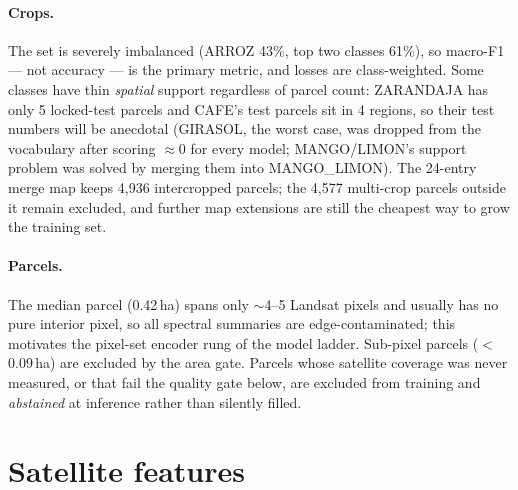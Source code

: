 \documentclass[11pt,a4paper]{article}
\begin{document}
\paragraph{Crops.} The set is severely imbalanced (ARROZ 43\%, top two classes 61\%), so
macro-F1 --- not accuracy --- is the primary metric, and losses are class-weighted. Some
classes have thin \emph{spatial} support regardless of parcel count: ZARANDAJA has only 5
locked-test parcels and CAFE's test parcels sit in 4 regions, so their test numbers will be
anecdotal (GIRASOL, the worst case, was dropped from the vocabulary after scoring
$\approx$0 for every model; MANGO/LIMON's support problem was solved by merging them into
MANGO\_LIMON). The 24-entry merge map keeps 4{,}936 intercropped parcels; the 4{,}577
multi-crop parcels outside it remain excluded, and further map extensions are still the
cheapest way to grow the training set.

\paragraph{Parcels.} The median parcel (0.42\,ha) spans only $\sim$4--5 Landsat pixels and
usually has no pure interior pixel, so all spectral summaries are edge-contaminated; this
motivates the pixel-set encoder rung of the model ladder. Sub-pixel parcels ($<$0.09\,ha) are
excluded by the area gate. Parcels whose satellite coverage was never measured, or that fail
the quality gate below, are excluded from training and \emph{abstained} at inference rather
than silently filled.

\section{Satellite features}
\label{sec:features}
\end{document}
